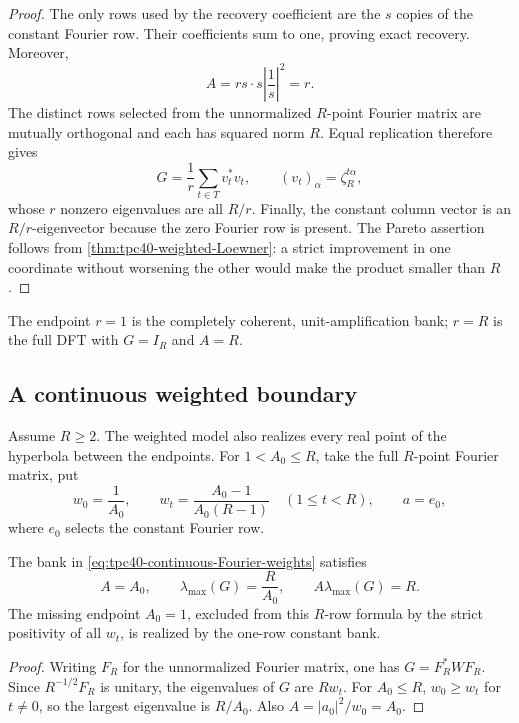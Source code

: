 \begin{proof}
The only rows used by the recovery coefficient are the \(s\) copies of
the constant Fourier row.  Their coefficients sum to one, proving exact
recovery.  Moreover,
\[
 A=rs\cdot s\left|\frac1s\right|^2=r.
\]
The distinct rows selected from the unnormalized \(R\)-point Fourier
matrix are mutually orthogonal and each has squared norm \(R\).  Equal
replication therefore gives
\[
 G=\frac1r\sum_{t\in T}v_t^*v_t,
 \qquad (v_t)_\alpha=\zeta_R^{t\alpha},
\]
whose \(r\) nonzero eigenvalues are all \(R/r\).  Finally, the constant
column vector is an \(R/r\)-eigenvector because the zero Fourier row is
present.  The Pareto assertion follows from
\cref{thm:tpc40-weighted-Loewner}: a strict improvement in one coordinate
without worsening the other would make the product smaller than \(R\).
\end{proof}

The endpoint \(r=1\) is the completely coherent, unit-amplification bank;
\(r=R\) is the full DFT with \(G=I_R\) and \(A=R\).

\subsection{A continuous weighted boundary}

Assume \(R\ge2\).  The weighted model also realizes every real point of
the hyperbola between the endpoints.  For \(1<A_0\le R\), take the full \(R\)-point Fourier
matrix, put
\begin{equation}
 w_0=\frac1{A_0},
 \qquad
 w_t=\frac{A_0-1}{A_0(R-1)}\quad(1\le t<R),
 \qquad
 a=e_0,
 \label{eq:tpc40-continuous-Fourier-weights}
\end{equation}
where \(e_0\) selects the constant Fourier row.

\begin{corollary}
\label{cor:tpc40-continuous-weighted-boundary}
The bank in \eqref{eq:tpc40-continuous-Fourier-weights} satisfies
\begin{equation}
 A=A_0,
 \qquad
 \lambda_{\max}(G)=\frac R{A_0},
 \qquad
 A\lambda_{\max}(G)=R.
 \label{eq:tpc40-continuous-Pareto-pair}
\end{equation}
The missing endpoint \(A_0=1\), excluded from this \(R\)-row formula by
the strict positivity of all \(w_t\), is realized by the one-row constant
bank.
\end{corollary}

\begin{proof}
Writing \(F_R\) for the unnormalized Fourier matrix, one has
\(G=F_R^*WF_R\).  Since \(R^{-1/2}F_R\) is unitary, the eigenvalues of
\(G\) are \(Rw_t\).  For \(A_0\le R\), \(w_0\ge w_t\) for \(t\ne0\), so
the largest eigenvalue is \(R/A_0\).  Also
\(A=|a_0|^2/w_0=A_0\).
\end{proof}

